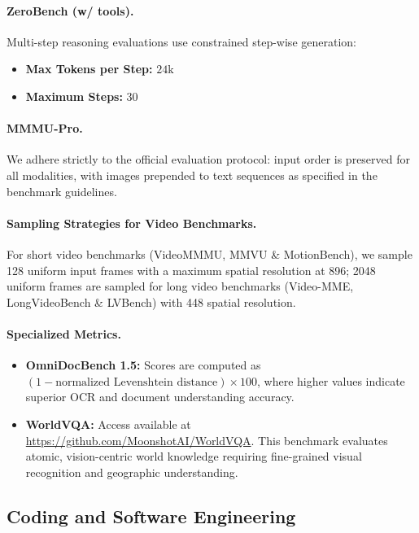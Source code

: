 \documentclass{article}
\begin{document}
\paragraph{ZeroBench (w/ tools).} Multi-step reasoning evaluations use constrained step-wise generation:
\begin{itemize}
    \item \textbf{Max Tokens per Step:} $24\text{k}$
    \item \textbf{Maximum Steps:} $30$
\end{itemize}

\paragraph{MMMU-Pro.} We adhere strictly to the official evaluation protocol: input order is preserved for all modalities, with images prepended to text sequences as specified in the benchmark guidelines. 

\paragraph{Sampling Strategies for Video Benchmarks.} For short video benchmarks (VideoMMMU, MMVU \& MotionBench), we sample 128 uniform input frames with a maximum spatial resolution at 896; 2048 uniform frames are sampled for long video benchmarks (Video-MME, LongVideoBench \& LVBench) with 448 spatial resolution.

\paragraph{Specialized Metrics.} 
\begin{itemize}
    \item \textbf{OmniDocBench 1.5:} Scores are computed as $(1 - \text{normalized Levenshtein distance}) \times 100$, where higher values indicate superior OCR and document understanding accuracy.
    \item \textbf{WorldVQA:} Access available at \url{https://github.com/MoonshotAI/WorldVQA}. This benchmark evaluates atomic, vision-centric world knowledge requiring fine-grained visual recognition and geographic understanding.
\end{itemize}

\subsection{Coding and Software Engineering}
\label{app:eval_coding}
\end{document}
